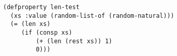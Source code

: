 \begin{Verbatim}
(defproperty len-test
  (xs :value (random-list-of (random-natural)))
  (= (len xs)
     (if (consp xs)
         (+ (len (rest xs)) 1)
         0)))
\end{Verbatim}

\begin{comment} ...suppressing defthm for now...
When a property holds under all circumstances, we can sometimes use the automated logic of ACL2 to prove it. To do so, we formulate the property as a theorem and press the ``Start'' button in the Dracula proof panel (right side of Dracula window). When the ``ACL2!\verb+>+'' prompt appears in the lower pane in the proof panel, we press the ``Admit'' arrow, and the automated logic of ACL2 starts trying to prove the theorem.

Theorem definitions are similar to property definitions, but the keyword is ``defthmd'' instead of ``defproperty''. The following theorem definition states the len-test property in a form that the automated logic of ACL2 can use to attempt a proof that the property holds under all circumstances.

\label{len-thm}
\begin{Verbatim}
(defthmd len-thm
  (= (len xs)
     (if (consp xs)
         (+ 1 (len (rest xs))) ; {len1}
         0)))                  ; {len0}
\end{Verbatim}

ACL2 interprets variables in theorems as if they were universally quantified. So, the formula ``(= (len $xs$) (if (consp $xs$) (+ 1 (len (rest $xs$))) 0))'' in the definition of len-thm means ``($\forall$$xs$.(= (len $xs$) (if (consp $xs$) (+ 1 (len (rest $xs$))) 0)))''.
In this case, ACL2 successfully proves the theorem, and Dracula colors the theorem green. (If ACL2 had failed to prove the theorem, Dracula would have colored it pink.) Because ACL2 succeeds in proving the theorem, we know that the ``len-test'' property from our doublecheck testing is true under all circumstances. We can cite this fact in proofs.

The len theorem contains two formulas that have the same meaning as (len $xs$). One of them, which we have labeled ``\{\emph{len1}\}'', applies when the argument in an invocation of len is a list with at least one element (that is, (consp $xs$) is true).  The other formula, which we have labeled ``\{\emph{len0}\}'', applies when the argument is the empty list (nil).
\end{comment}

